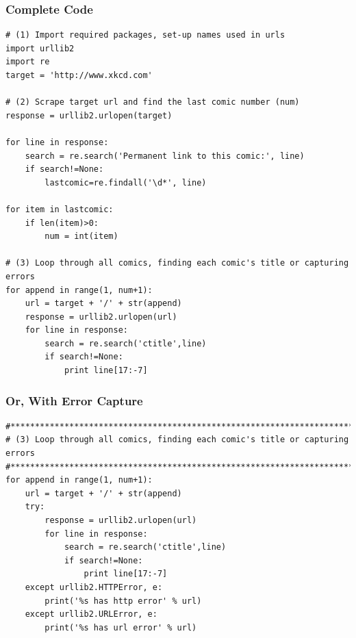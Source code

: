 \documentclass[10pt,letterpaper,subeqn]{beamer}
\begin{document}
\begin{frame}[fragile]
 \frametitle{Complete Code}
 \begin{verbatim}
# (1) Import required packages, set-up names used in urls
import urllib2
import re
target = 'http://www.xkcd.com'

# (2) Scrape target url and find the last comic number (num)
response = urllib2.urlopen(target)

for line in response:
    search = re.search('Permanent link to this comic:', line)
    if search!=None:
        lastcomic=re.findall('\d*', line)

for item in lastcomic:
    if len(item)>0:
        num = int(item)

# (3) Loop through all comics, finding each comic's title or capturing errors
for append in range(1, num+1):
    url = target + '/' + str(append)
    response = urllib2.urlopen(url)
    for line in response:
        search = re.search('ctitle',line)
        if search!=None:
            print line[17:-7]
\end{verbatim}
\end{frame}


\begin{frame}[fragile]
 \frametitle{Or, With Error Capture}
 \begin{verbatim}
#*******************************************************************************
# (3) Loop through all comics, finding each comic's title or capturing errors
#*******************************************************************************
for append in range(1, num+1):
    url = target + '/' + str(append)
    try:
        response = urllib2.urlopen(url)
        for line in response:
            search = re.search('ctitle',line)
            if search!=None:
                print line[17:-7]
    except urllib2.HTTPError, e:
        print('%s has http error' % url)
    except urllib2.URLError, e:
        print('%s has url error' % url)


\end{verbatim}
\end{frame}
\end{document}
